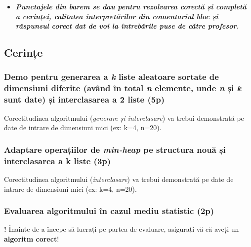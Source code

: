 \documentclass[../ro-fa-lab.tex]{subfiles}
\begin{document}
\begin{itemize}
\item
  \emph{\textbf{Punctajele din barem se dau pentru rezolvarea corectă și
  completă a cerinței, calitatea interpretărilor din comentariul bloc și
  răspunsul corect dat de voi la întrebările puse de către profesor.}}
\end{itemize}

\subsection{Cerințe}\label{cerinux21be}

\subsubsection{\texorpdfstring{Demo pentru generarea a \emph{k} liste
aleatoare sortate de dimensiuni diferite (având în total \emph{n}
elemente, unde \emph{n} și \emph{k} sunt date) și interclasarea a 2
liste
(5p)}{Demo pentru generarea a k liste aleatoare sortate de dimensiuni diferite (având în total n elemente, unde n și k sunt date) și interclasarea a 2 liste (5p)}}\label{demo-pentru-generarea-a-k-liste-aleatoare-sortate-de-dimensiuni-diferite-avuxe2nd-uxeen-total-n-elemente-unde-n-ux219i-k-sunt-date-ux219i-interclasarea-a-2-liste-5p}

Corectitudinea algoritmului (\emph{generare și interclasare}) va trebui
demonstrată pe date de intrare de dimensiuni mici (ex: k=4, n=20).

\subsubsection{\texorpdfstring{Adaptare operațiilor de \emph{min-heap} pe
structura nouă și interclasarea a k liste
(3p)}{Adaptare operațiilor de min-heap pe structura nouă și interclasarea a k liste (3p)}}\label{adaptare-operaux21biilor-de-min-heap-pe-structura-nouux103-ux219i-interclasarea-a-k-liste-3p}

Corectitudinea algoritmului (\emph{interclasare}) va trebui demonstrată
pe date de intrare de dimensiuni mici (ex: k=4, n=20).

\subsubsection{Evaluarea algoritmului în cazul mediu statistic
(2p)}\label{evaluarea-algoritmului-uxeen-cazul-mediu-statistic-2p}

\textbf{!} Înainte de a începe să lucrați pe partea de evaluare,
asigurați-vă că aveți un \textbf{algoritm corect}!
\end{document}
